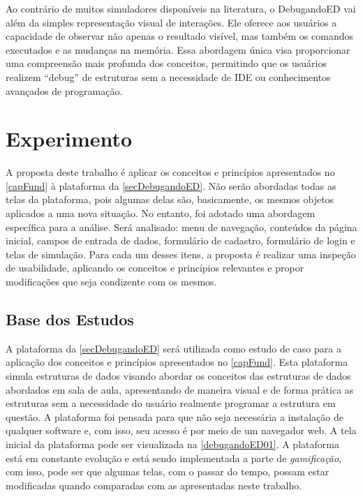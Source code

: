 Ao contrário de muitos simuladores disponíveis na literatura, o DebugandoED vai além da simples representação visual de interações. Ele oferece aos usuários a capacidade de observar não apenas o resultado visível, mas também os comandos executados e as mudanças na memória. Essa abordagem única visa proporcionar uma compreensão mais profunda dos conceitos, permitindo que os usuários realizem “debug” de estruturas sem a necessidade de \ac{IDE} ou conhecimentos avançados de programação.

\section{Experimento}
\label{secExperimentos}
A proposta deste trabalho é aplicar os conceitos e princípios apresentados no \autoref{capFund} à plataforma da \autoref{secDebugandoED}. Não serão abordadas todas as telas da plataforma, pois algumas delas são, basicamente, os mesmos objetos aplicados a uma nova situação. No entanto, foi adotado uma abordagem específica para a análise. Será analisado: menu de navegação, conteúdos da página inicial, campos de entrada de dados, formulário de cadastro, formulário de login e telas de simulação. Para cada um desses itens, a proposta é realizar uma inspeção de usabilidade, aplicando os conceitos e princípios relevantes e propor modificações que seja condizente com os mesmos.

\subsection{Base dos Estudos}

A plataforma da \autoref{secDebugandoED} será utilizada como estudo de caso para a aplicação dos conceitos e princípios apresentados no \autoref{capFund}. Esta plataforma simula estruturas de dados visando abordar os conceitos das estruturas de dados abordados em sala de aula, apresentando de maneira visual e de forma prática as estruturas sem a necessidade do usuário realmente programar a estrutura em questão. A plataforma foi pensada para que não seja necessária a instalação de qualquer software e, com isso, seu acesso é por meio de um navegador web. A tela inicial da plataforma pode ser visualizada na \autoref{debugandoED01}. A plataforma está em constante evolução e está sendo implementada a parte de \textit{gamificação}, com isso, pode ser que algumas telas, com o passar do tempo, possam estar modificadas quando comparadas com as apresentadas neste trabalho.

